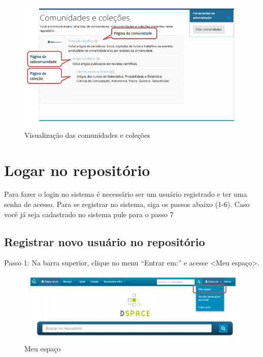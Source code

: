 \documentclass[12pt,hidelinks]{article}
\begin{document}
        \begin{figure}[!htp]
                \centering
                \includegraphics[scale=0.8]{figura/Figura1.png}
                \caption{Visualização das comunidades e coleções}
            \label{Rotulo}
        \end{figure}
        
\newpage
\section{Logar no repositório}
\newpage
    Para fazer o login no sistema é necessário ser um usuário registrado e ter uma senha de acesso. Para se registrar no sistema, siga os passos abaixo (1-6). Caso você já seja cadastrado no sistema pule para o passo 7
    \subsection{Registrar novo usuário no repositório}
    
    Passo 1: Na barra superior, clique no menu “Entrar em:” e acesse <Meu espaço>.
     \begin{figure}[!htp]
                \centering
                \includegraphics[scale=0.7]{figura/Figura2.png}
                \caption{Meu espaço}
            \label{Rotulo}
        \end{figure}   
        
\end{document}
